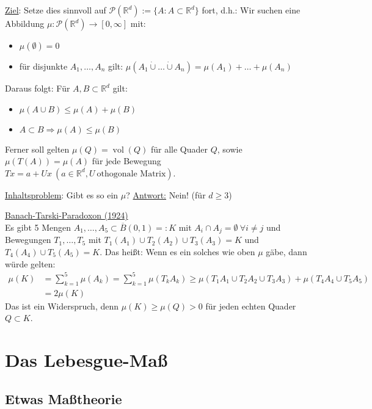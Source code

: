 \documentclass[a4paper]{report}
\newcommand{\PowerSet}{\mathcal{P}}
\newcommand{\R}{\mathbb{R}}
\newcommand{\dcup}{\dot{\cup}}
\theoremstyle{plain}
\theoremstyle{definition}
\begin{document}
\uline{Ziel}: Setze dies sinnvoll auf $\PowerSet(\R^d) := \{A : A \subset \R^d\}$ fort, d.h.: Wir suchen eine Abbildung $\mu:\PowerSet(\R^d) \rightarrow [0,\infty]$ mit:
\begin{itemize}
 \item $\mu(\emptyset) = 0$
 \item für disjunkte $A_1, \dots, A_n$ gilt: $\mu(A_1 \dcup \dots \dcup A_n) = \mu(A_1) + \dots + \mu(A_n)$
\end{itemize}
Daraus folgt: Für $A,B \subset \R^d$ gilt:
\begin{itemize}
    \item $\mu(A \cup B) \le \mu(A) + \mu(B)$
    \item $A \subset B \Rightarrow \mu(A) \le \mu(B)$
\end{itemize}
Ferner soll gelten $\mu(Q) = \operatorname{vol}(Q)$ für alle Quader $Q$, sowie $\mu(T(A)) = \mu(A)$ für jede Bewegung $Tx = a + Ux \ (a \in \R^d, U \ \text{othogonale Matrix})$.

\vspace{12pt}

\uline{Inhaltsproblem}: Gibt es so ein $\mu$? \uline{Antwort:} Nein! (für $d \ge 3$)

\vspace{12pt}

\uline{Banach-Tarski-Paradoxon (1924)}\\
Es gibt 5 Mengen $A_1, \dots, A_5 \subset \overline{B}(0,1) =: K$ mit $A_i \cap A_j = \emptyset \ \forall i \ne j$ und Bewegungen $T_1,\dots, T_5$ mit $T_1(A_1) \cup T_2(A_2) \cup T_3(A_3) = K$ und $T_4(A_4) \cup T_5(A_5) = K$.
Das heißt: Wenn es ein solches wie oben $\mu$ gäbe, dann würde gelten:
\begin{displaymath}
    \begin{split}
        \mu(K) &= \sum_{k=1}^5 \mu(A_k) = \sum_{k=1}^5 \mu(T_k A_k) \ge \mu(T_1 A_1 \cup T_2 A_2 \cup T_3 A_3) + \mu(T_4 A_4 \cup T_5 A_5) \\
        &= 2 \mu(K) 
    \end{split}
\end{displaymath} 
Das ist ein Widerspruch, denn $\mu(K) \ge \mu(Q) > 0$ für jeden echten Quader $Q \subset K$.

\chapter{Das Lebesgue-Maß}
\section{Etwas Maßtheorie}
\end{document}
